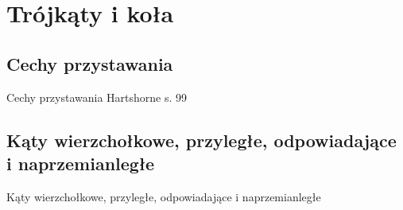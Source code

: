 \section{Trójkąty i koła}
\subsection{Cechy przystawania}
Cechy przystawania
\loremipsum
Hartshorne s. 99

\subsection{Kąty wierzchołkowe, przyległe, odpowiadające i naprzemianległe}
Kąty wierzchołkowe, przyległe, odpowiadające i naprzemianległe
\loremipsum








